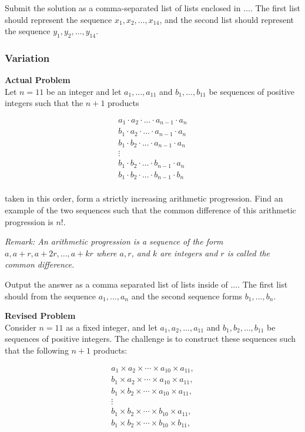 Submit the solution as a comma-separated list of lists enclosed in $\boxed{...}$. The first list should represent the sequence $x_1, x_2, \ldots, x_{14}$, and the second list should represent the sequence $y_1, y_2, \ldots, y_{14}$.

\subsubsection{Variation}
\textbf{Actual Problem}\\
Let $n = 11$ be an integer and let $a_1, ..., a_{11}$ and $b_1, ..., b_{11}$ be sequences of positive integers such that the $n+1$ products

\begin{align*}
    a_1 \cdot a_2 \cdot ... \cdot a_{n-1} \cdot a_{n} \\
    b_1 \cdot a_2 \cdot ... \cdot a_{n-1} \cdot a_{n} \\
    b_1 \cdot b_2 \cdot ... \cdot a_{n-1} \cdot a_{n} \\
    \vdots \\
    b_1 \cdot b_2 \cdot ... \cdot b_{n-1} \cdot a_{n} \\
    b_1 \cdot b_2 \cdot ... \cdot b_{n-1} \cdot b_{n} \\
\end{align*}

taken in this order, form a strictly increasing arithmetic progression. Find an example of the two sequences such that the common difference of this arithmetic progression is $n!$.

\textit{Remark: An arithmetic progression is a sequence of the form $a, a + r, a + 2r, ..., a + kr$ where $a, r$, and $k$ are integers and $r$ is called the common difference.}

Output the answer as a comma separated list of lists inside of $\boxed{...}$. The first list should from the sequence $a_1, ..., a_n$ and the second sequence forms $b_1, ..., b_n$.

\textbf{Revised Problem}\\
Consider \( n = 11 \) as a fixed integer, and let \( a_1, a_2, \ldots, a_{11} \) and \( b_1, b_2, \ldots, b_{11} \) be sequences of positive integers. The challenge is to construct these sequences such that the following \( n+1 \) products:

\[
\begin{align*}
    a_1 \times a_2 \times \cdots \times a_{10} \times a_{11}, \\
    b_1 \times a_2 \times \cdots \times a_{10} \times a_{11}, \\
    b_1 \times b_2 \times \cdots \times a_{10} \times a_{11}, \\
    \vdots \\
    b_1 \times b_2 \times \cdots \times b_{10} \times a_{11}, \\
    b_1 \times b_2 \times \cdots \times b_{10} \times b_{11},
\end{align*}
\]

